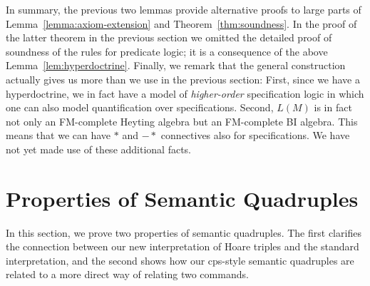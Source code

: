 \documentclass{LMCS}
\begin{document}
In summary, the previous two lemmas provide alternative proofs to large parts
of Lemma~\ref{lemma:axiom-extension} and Theorem~\ref{thm:soundness}. In
the proof of the latter theorem in the previous section we omitted the
detailed proof of soundness of the rules for predicate logic; it is a
consequence of the above Lemma~\ref{lem:hyperdoctrine}.  Finally, we remark
that the general construction actually gives us more than we use in the
previous section: First, since we have a hyperdoctrine, we in fact have a
model of \emph{higher-order} specification logic in which one can also
model quantification over specifications.  Second, $L(M)$ is in fact not
only an FM-complete Heyting algebra but an FM-complete BI algebra. This
means that we can have $*$ and $-\!\!*$ connectives also for
specifications.  We have not yet made use of these additional facts.

\section{Properties of Semantic Quadruples}
\label{sec:quadruples}

In this section, we prove two properties of semantic quadruples.
The first clarifies the connection between our new interpretation 
of Hoare triples and the standard interpretation, 
and the second shows how our cps-style 
semantic quadruples are related to a more direct way
of relating two commands.
\end{document}
